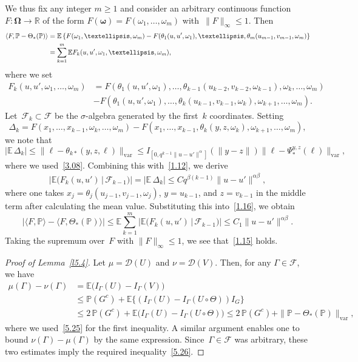 \documentclass[11pt]{article}
\theoremstyle{plain}
\theoremstyle{definition}
\let\mathcal\mathscr
\theoremstyle{plain}
\numberwithin{equation}{section}
\newcommand{\R}{{\mathbb R}}
\newcommand{\IP}{{\mathbb P}}
\newcommand{\E}{{\mathbb E}}
\newcommand{\OOmega}{{\boldsymbol\Omega}}
\newcommand{\oomega}{{\boldsymbol\omega}}
\newcommand{\DD}{{\mathcal D}}
\newcommand{\FF}{{\mathcal F}}
\begin{document}
We thus fix any integer $m\ge1$ and consider an arbitrary continuous function $F:\OOmega\to\R$ of the form $F(\oomega)=F(\omega_1,\dots,\omega_m)$ with~$\|F\|_\infty\le 1$. Then
\begin{align}
\langle F,\IP-\Theta_*(\IP)\rangle
&=\E\left\{F(\omega_1,\dots,\omega_m)
-F(\theta_1(u,u',\omega_1),\dots,\theta_m(u_{m-1},v_{m-1},\omega_m)\right\}
\notag\\
&=\sum_{k=1}^m \E F_k(u,u',\omega_1,\dots,\omega_m),
\label{1.16}
\end{align}
where we set
\begin{align*}
F_k(u,u',\omega_1,\dots,\omega_m)
&=F(\theta_1(u,u',\omega_1),\dots,\theta_{k-1}(u_{k-2},v_{k-2},\omega_{k-1}),\omega_k,\dots,\omega_m)\\
&-F(\theta_{1}(u,u',\omega_1),\dots,\theta_{k}(u_{k-1},v_{k-1},\omega_{k}),\omega_{k+1},\dots,\omega_m).
\end{align*}
Let~$\FF_k\subset\FF$ be the $\sigma$-algebra generated by the first~$k$ coordinates. Setting
\[
\Delta_k=F(x_1,\dots,x_{k-1},\omega_k,\dots,\omega_m)
-F(x_1,\dots,x_{k-1},\theta_{k}(y,z,\omega_{k}),\omega_{k+1},\dots,\omega_m),
\]
we note that
\[
|\E\,\Delta_k|\le \|\ell-\theta_{k*}(y,z,\ell)\|_{\mathrm{var}}
\le I_{[0,q^{k-1}\|u-u'\|^\alpha]}(\|y-z\|)\|\ell-\varPsi_*^{y,z}(\ell)\|_{\mathrm{var}},
\]
where we used~\eqref{3.08}. Combining this with~\eqref{1.12}, we derive
\begin{align*}
\bigl|\E\bigl(F_k(u,u')\,|\,\FF_{k-1}\bigr)\bigr|=|\E\,\Delta_k|
\le Cq^{\beta(k-1)}\|u-u'\|^{\alpha\beta},
\end{align*}
where one takes $x_j =\theta_j(u_{j-1},v_{j-1},\omega_j)$, $y=u_{k-1}$, and $z=v_{k-1}$ in the middle term after calculating the mean value.
Substituting this into~\eqref{1.16}, we obtain
\[
|\langle F,\IP\rangle-\langle F,\Theta_*(\IP)\rangle|
\le \E\sum_{k=1}^m \bigl|\E\bigl(F_k(u,u')\,|\,\FF_{k-1}\bigr)\bigr|
\le C_1\|u-u'\|^{\alpha\beta}.
\]
Taking the supremum over~$F$ with $\|F\|_\infty\le1$, we see that~\eqref{1.15} holds.

\begin{proof}[Proof of Lemma~\ref{l5.4}]
Let $\mu=\DD(U)$ and $\nu=\DD(V)$. Then, for any $\Gamma\in\FF$, we have
\begin{align*}
\mu(\Gamma)-\nu(\Gamma)
&=\E\bigl(I_\Gamma(U)-I_\Gamma(V)\bigl)\\
&\le \IP(G^c)+\E\bigl\{(I_\Gamma(U)-I_\Gamma(U\circ\Theta))I_G\bigl\}\\
&\le 2\,\IP(G^c)+\E\bigl(I_\Gamma(U)-I_\Gamma(U\circ\Theta)\bigl)
\le 2\,\IP(G^c)+\|\IP-\Theta_*(\IP)\|_{\mathrm{var}},
\end{align*}
where we used~\eqref{5.25} for the first inequality.
A similar argument enables one to bound $\nu(\Gamma)-\mu(\Gamma)$ by the same expression. Since~$\Gamma\in\FF$ was arbitrary, these two estimates imply the required inequality~\eqref{5.26}.
\end{proof}
\end{document}
